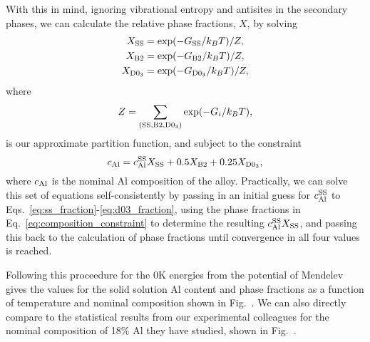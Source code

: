 With this in mind, ignoring vibrational entropy and antisites in the secondary phases, we can calculate the relative phase fractions, $X$, by solving
%
\begin{eqnarray}
    X_{\mathrm{SS}} &= \exp(-G_{\mathrm{SS}} / k_B T) / Z, \label{eq:ss_fraction} \\
    X_{\mathrm{B}2} &= \exp(-G_{\mathrm{B}2} / k_B T) / Z, \label{eq:b2_fraction} \\
    X_{\mathrm{D}0_3} &= \exp(-G_{\mathrm{D}0_3} / k_B T) / Z, \label{eq:d03_fraction}
\end{eqnarray}
%
where
\begin{equation}
    \label{eq:partition}
    Z = \sum_{(\mathrm{SS}, {\mathrm{B}2}, {\mathrm{D}0_3})} \exp(-G_i / k_B T),
\end{equation}
%
is our approximate partition function, and subject to the constraint
\begin{equation}
    \label{eq:composition_constraint}
    c_{\mathrm{Al}} = c_{\mathrm{Al}}^{\mathrm{SS}} X_{\mathrm{SS}} + 0.5 X_{{\mathrm{B}2}} + 0.25 X_{{\mathrm{D}0_3}},
\end{equation}
where $c_{\mathrm{Al}}$ is the nominal Al composition of the alloy.
Practically, we can solve this set of equations self-consistently by passing in an initial guess for $c_{\mathrm{Al}}^{\mathrm{SS}}$ to Eqs.~\ref{eq:ss_fraction}-\ref{eq:d03_fraction}, using the phase fractions in Eq.~\ref{eq:composition_constraint} to determine the resulting $c_{\mathrm{Al}}^{\mathrm{SS}} X_{\mathrm{SS}}$, and passing this back to the calculation of phase fractions until convergence in all four values is reached.

Following this proceedure for the 0K energies from the potential of Mendelev \etal~\cite{mendelev2005effect} gives the values for the solid solution Al content and phase fractions as a function of temperature and nominal composition shown in Fig.~. We can also directly compare to the statistical results from our experimental colleagues for the nominal composition of 18\% Al they have studied, shown in Fig.~.

